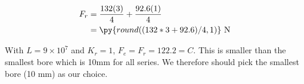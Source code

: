 \documentclass[a4paper,openany]{tufte-book}
\begin{document}
\begin{enumerate}
\begin{align}
  F_{r} &= \frac{132(3)}{4} + \frac{92.6(1)}{4} \\
        &= \py{round((132*3+92.6)/4,1)} \text{ N}
\end{align}

With \(L = 9 \times 10^{7}\) and \(K_{r} = 1\),
\(F_{e} = F_{r} = 122.2 = C\). This is smaller than the smallest bore
which is 10mm for all series. We therefore should pick the smallest
bore (10 mm) as our choice.
\end{enumerate}

\backmatter

\printbibliography
\end{document}

